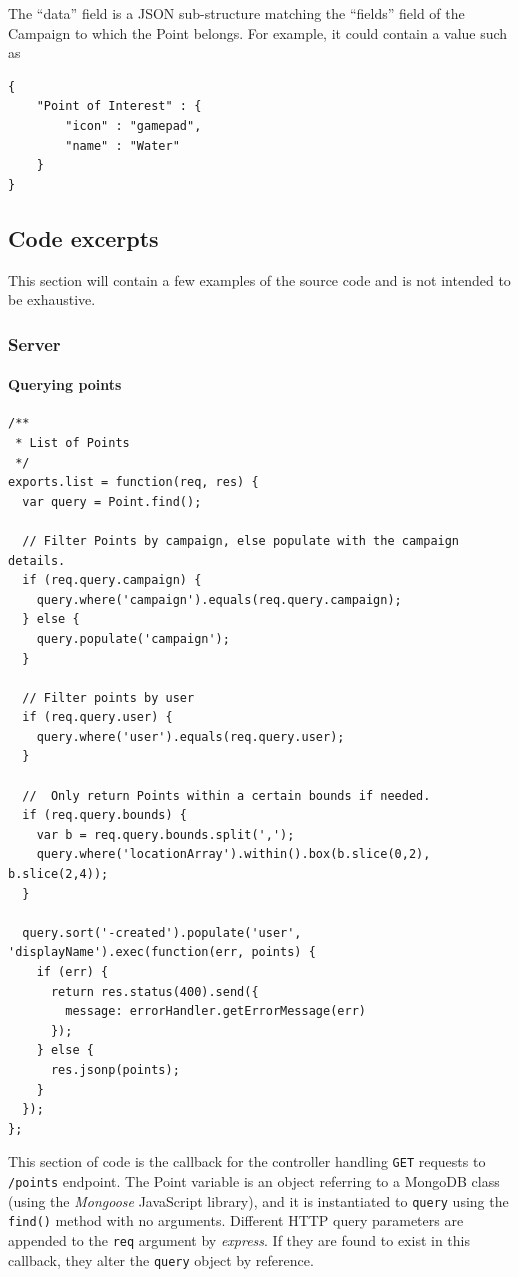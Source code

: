 \documentclass{article}
\begin{document}
		The ``data'' field is a JSON sub-structure matching the ``fields'' field of the Campaign to which the Point belongs. For example, it could contain a value such as

		\begin{verbatim}
{
    "Point of Interest" : {
        "icon" : "gamepad",
        "name" : "Water"
    }
}
		\end{verbatim}

		\subsection{Code excerpts}

		This section will contain a few examples of the source code and is not intended to be exhaustive.

		\subsubsection{Server}

		\paragraph{Querying points}

		\begin{verbatim}
/**
 * List of Points
 */
exports.list = function(req, res) {
  var query = Point.find();

  // Filter Points by campaign, else populate with the campaign details.
  if (req.query.campaign) {
    query.where('campaign').equals(req.query.campaign);
  } else {
    query.populate('campaign');
  }

  // Filter points by user
  if (req.query.user) {
    query.where('user').equals(req.query.user);
  }

  //  Only return Points within a certain bounds if needed.
  if (req.query.bounds) {
    var b = req.query.bounds.split(',');
    query.where('locationArray').within().box(b.slice(0,2), b.slice(2,4));
  }

  query.sort('-created').populate('user', 'displayName').exec(function(err, points) {
    if (err) {
      return res.status(400).send({
        message: errorHandler.getErrorMessage(err)
      });
    } else {
      res.jsonp(points);
    }
  });
};
	\end{verbatim}

	This section of code is the callback for the controller handling \texttt{GET} requests to \texttt{/points} endpoint. The Point variable is an object referring to a MongoDB class (using the \emph{Mongoose} JavaScript library), and it is instantiated to \texttt{query} using the \texttt{find()} method with no arguments. Different HTTP query parameters are appended to the \texttt{req} argument by \emph{express}. If they are found to exist in this callback, they alter the \texttt{query} object by reference.
\end{document}
